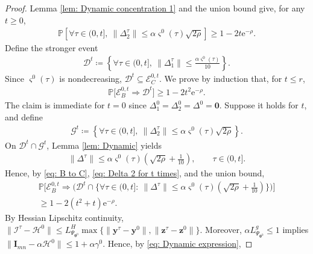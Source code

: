 \documentclass{siamart251216}
\begin{document}
\begin{proof}
    Lemma \ref{lem: Dynamic concentration 1} and the union bound give, for any $t\geq0$,
    \begin{gather}
        \label{eq: Delta 2 for t times}
        \mathbb{P}\left[\forall\tau\in(0,t],~\|\Delta_{2}^{\tau}\|\leq\alpha\varsigma^{0}(\tau)\sqrt{2\rho}\right]\geq1-2t\mathrm{e}^{-\rho}.
    \end{gather}
    Define the stronger event
    \begin{gather*}
        \mathcal{D}^{t}\coloneqq\left\{\forall\tau\in(0,t],~\|\Delta_{1}^{\tau}\|\leq\frac{\alpha\varsigma^{0}(\tau)}{10}\right\}.
    \end{gather*}
    Since $\varsigma^{0}(\tau)$ is nondecreasing, $\mathcal{D}^{t}\subseteq\mathcal{E}_{C}^{0,t}$. We prove by induction that, for $t\leq r$,
    \begin{gather}
        \label{eq: B to C}
        \mathbb{P}\Big[\mathcal{E}_{B}^{0,t}\Rightarrow\mathcal{D}^{t}\Big]\geq1-2t^{2}\mathrm{e}^{-\rho}.
    \end{gather}
    The claim is immediate for $t=0$ since $\Delta_{1}^{0}=\Delta_{2}^{0}=\Delta^{0}=\bm{0}$. Suppose it holds for $t$, and define
    \begin{gather}
        \label{eq: B to C and}
        \mathcal{G}^{t}\coloneqq\left\{\forall\tau\in(0,t],~\|\Delta_{2}^{\tau}\|\leq\alpha\varsigma^{0}(\tau)\sqrt{2\rho}\right\}.
    \end{gather}
    On $\mathcal{D}^{t}\cap\mathcal{G}^{t}$, Lemma \ref{lem: Dynamic} yields
    \begin{gather*}
        \|\Delta^{\tau}\|\leq\alpha\varsigma^{0}(\tau)\left(\sqrt{2\rho}+\frac{1}{10}\right),\qquad \tau\in(0,t].
    \end{gather*}
    Hence, by \eqref{eq: B to C}, \eqref{eq: Delta 2 for t times}, and the union bound,
    \begin{multline}
        \label{eq: Set B to C and Delta}
        \mathbb{P}\Big[\mathcal{E}_{B}^{0,t}\Rightarrow\big(\mathcal{D}^{t}\cap
        \{\forall\tau\in(0,t]:~\|\Delta^{\tau}\|\leq\alpha\varsigma^{0}(\tau)(\sqrt{2\rho}+\tfrac{1}{10})\}\big)\Big]\\
        \geq1-2(t^{2}+t)\mathrm{e}^{-\rho}.
    \end{multline}
    By Hessian Lipschitz continuity, $\|\mathcal{I}^{\tau}-\mathcal{H}^{0}\|\leq L_{\Psi_{\boldsymbol{\theta}^{0}}}^{H}\max\{\|\mathbf{y}^{\tau}-\mathbf{y}^{0}\|,\|\mathbf{z}^{\tau}-\mathbf{z}^{0}\|\}$. Moreover, $\alpha L_{\Psi_{\boldsymbol{\theta}^{0}}}^{g}\leq1$ implies $\|\mathbf{I}_{mn}-\alpha\mathcal{H}^{0}\|\leq1+\alpha\gamma^{0}$. Hence, by \eqref{eq: Dynamic expression},

\end{proof}
\end{document}
